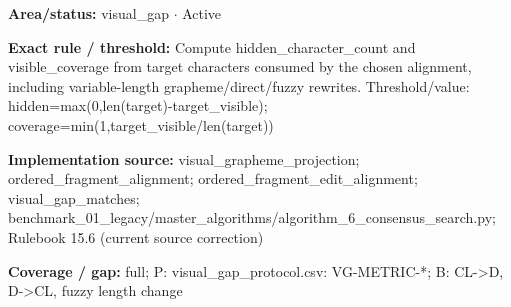 \begin{tcolorbox}[enhanced,breakable,colback=white,colframe=Muted!45,boxrule=0.45pt,arc=1.5pt,left=6pt,right=6pt,top=5pt,bottom=5pt,title={\texttt{VG-TARGET-METRICS-12}},title after break={\texttt{VG-TARGET-METRICS-12}\ (continued)},fonttitle=\headingfont\bfseries\color{Navy},coltitle=Navy]
\textbf{Area/status:} visual\_\allowbreak{}gap $\boldsymbol{\cdot}$ Active\par
\smallskip
\textbf{Exact rule / threshold:} Compute hidden\_\allowbreak{}character\_\allowbreak{}count and visible\_\allowbreak{}coverage from target characters consumed by the chosen alignment, including variable-length grapheme/\allowbreak{}direct/\allowbreak{}fuzzy rewrites. Threshold/\allowbreak{}value: hidden=max(0,len(target)-target\_\allowbreak{}visible); coverage=min(1,target\_\allowbreak{}visible/\allowbreak{}len(target))\par
\smallskip
\textbf{Implementation source:} visual\_\allowbreak{}grapheme\_\allowbreak{}projection; ordered\_\allowbreak{}fragment\_\allowbreak{}alignment; ordered\_\allowbreak{}fragment\_\allowbreak{}edit\_\allowbreak{}alignment; visual\_\allowbreak{}gap\_\allowbreak{}matches; benchmark\_\allowbreak{}01\_\allowbreak{}legacy/\allowbreak{}master\_\allowbreak{}algorithms/\allowbreak{}algorithm\_\allowbreak{}6\_\allowbreak{}consensus\_\allowbreak{}search.py; Rulebook 15.6 (current source correction)\par
\smallskip
\textbf{Coverage / gap:} full; P: visual\_\allowbreak{}gap\_\allowbreak{}protocol.csv: VG-METRIC-*; B: CL->D, D->CL, fuzzy length change
\end{tcolorbox}
\endgroup
